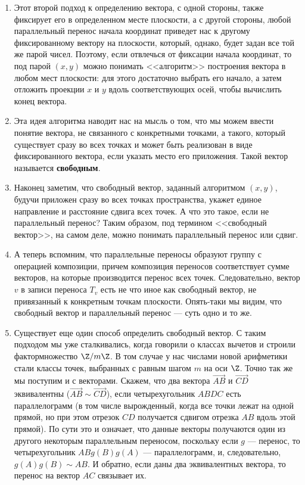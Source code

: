 \begin{enumerate}
\item Этот второй подход к определению вектора, с одной стороны, также фиксирует его в определенном месте плоскости, а с другой стороны, любой параллельный перенос начала координат приведет нас к другому фиксированному вектору на плоскости, который, однако, будет задан все той же парой чисел. Поэтому, если отвлечься от фиксации начала координат, то под парой $(x,y)$ можно понимать <<алгоритм>> построения вектора в любом мест плоскости: для этого достаточно выбрать его начало, а затем отложить проекции $x$ и $y$ вдоль соответствующих осей, чтобы вычислить конец вектора.
\item Эта идея алгоритма наводит нас на мысль о том, что мы можем ввести понятие вектора, не связанного с конкретными точками, а такого, который существует сразу во всех точках и может быть реализован в виде фиксированного вектора, если указать место его приложения. Такой вектор называется \textbf{свободным}.
\item Наконец заметим, что свободный вектор, заданный алгоритмом $(x,y)$, будучи приложен сразу во всех точках пространства, укажет единое направление и расстояние сдвига всех точек. А что это такое, если не параллельный перенос? Таким образом, под термином <<свободный вектор>>, на самом деле, можно понимать параллельный перенос или сдвиг.
\item А теперь вспомним, что параллельные переносы образуют группу с операцией композиции, причем композиция переносов соответствует сумме векторов, на которые производится перенос всех точек. Следовательно, вектор $v$ в записи переноса $T_v$ есть не что иное как свободный вектор, не привязанный к конкретным точкам плоскости. Опять-таки мы видим, что свободный вектор и параллельный перенос --- суть одно и то же.
\item Существует еще один способ определить свободный вектор. С таким подходом мы уже сталкивались, когда говорили о классах вычетов и строили фактормножество $\Z/m\Z$. В том случае у нас числами новой арифметики стали классы точек, выбранных с равным шагом $m$ на оси $\Z$. Точно так же мы поступим и с векторами. Скажем, что два вектора $\vec{AB}$ и $\vec{CD}$ эквивалентны ($\vec{AB}\sim\vec{CD}$), если четырехугольник $ABDC$ есть параллелограмм (в том числе вырожденный, когда все точки лежат на одной прямой, но при этом отрезок $CD$ получается сдвигом отрезка $AB$ вдоль этой прямой). По сути это и означает, что данные векторы получаются один из другого некоторым параллельным переносом, поскольку если $g$ --- перенос, то четырехугольник $ABg(B)g(A)$ --- параллелограмм, и, следовательно, $g(A)g(B)\sim AB$. И обратно, если даны два эквивалентных вектора, то перенос на вектор $AC$ связывает их.

\end{enumerate}
